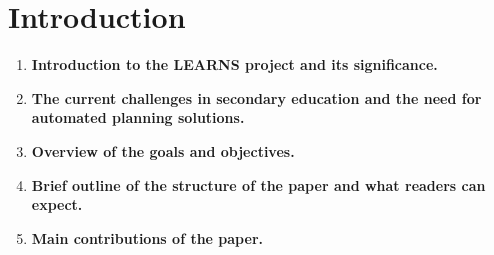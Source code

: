 \section{Introduction}
\begin{enumerate}
    \item \textbf{Introduction to the LEARNS project and its significance.}
    \item \textbf{The current challenges in secondary education and the need for automated planning solutions.}
    \item \textbf{Overview of the goals and objectives.}
    \item \textbf{Brief outline of the structure of the paper and what readers can expect.}
    \item \textbf{Main contributions of the paper.}
\end{enumerate}